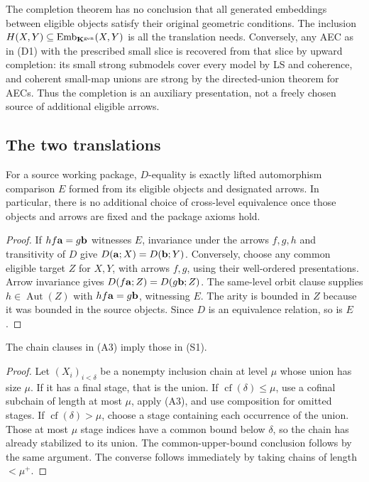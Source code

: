 \begin{remark}
The completion theorem has no conclusion that all generated embeddings
between eligible objects satisfy their original geometric conditions.
The inclusion $H(X,Y)\subseteq\operatorname{Emb}_{\mathbf K^{\mathrm{gen}}}(X,Y)$
is all the translation needs. Conversely, any AEC as in (D1) with the
prescribed small slice is recovered from that slice by upward completion:
its small strong submodels cover every model by LS and coherence, and
coherent small-map unions are strong by the directed-union theorem for
AECs. Thus the completion is an auxiliary presentation, not a freely
chosen source of additional eligible arrows.
\end{remark}

\subsection{The two translations}
\begin{lemma}\label{lem:source-la}
For a source working package, $D$-equality is exactly lifted automorphism
comparison $E$ formed from its eligible objects and designated arrows.
In particular, there is no additional choice of cross-level equivalence
once those objects and arrows are fixed and the package axioms hold.
\end{lemma}
\begin{proof}
If $hf\mathbf{a}=g\mathbf{b}$ witnesses $E$, invariance under the arrows $f,g,h$
and transitivity of $D$ give $D(\mathbf{a};X)=D(\mathbf{b};Y)$.
Conversely, choose any common eligible target $Z$ for $X,Y$, with arrows
$f,g$, using their well-ordered presentations. Arrow invariance gives
$D(f\mathbf{a};Z)=D(g\mathbf{b};Z)$. The same-level orbit clause supplies
$h\in\operatorname{Aut}(Z)$ with $hf\mathbf{a}=g\mathbf{b}$, witnessing $E$.
The arity is bounded in $Z$ because it was bounded in the source
objects. Since $D$ is an equivalence relation, so is $E$.
\end{proof}

\begin{lemma}
\label{lem:long-fixed-chains}
The chain clauses in (A3) imply those in (S1).
\end{lemma}
\begin{proof}
Let $(X_i)_{i<\delta}$ be a nonempty inclusion chain at level $\mu$
whose union has size $\mu$. If it has a final stage, that is the union.
If $\operatorname{cf}(\delta)\leq\mu$, use a cofinal subchain of length
at most $\mu$, apply (A3), and use composition for omitted stages.
If $\operatorname{cf}(\delta)>\mu$, choose a stage containing each
occurrence of the union. Those at most $\mu$ stage indices have a common
bound below $\delta$, so the chain has already stabilized to its union.
The common-upper-bound conclusion follows by the same argument.
The converse follows immediately by taking chains of length $<\mu^+$.
\end{proof}

